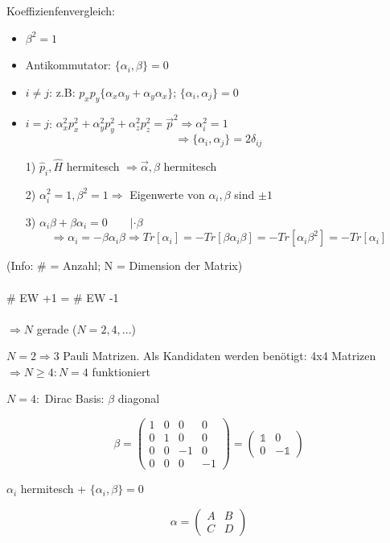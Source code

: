 Koeffizienfenvergleich:
\begin{itemize}
\item  \(\boxed{\beta^2=1}\)
\item Antikommutator: \(\boxed{\{\alpha_i,\beta\}=0}\)
\item \(i\neq j\): z.B: \(p_xp_y\{\alpha_x\alpha_y+\alpha_y\alpha_x\}\); \(\{\alpha_i,\alpha_j\}=0\)
\item \(i=j\): \(\alpha_x^2p_x^2+\alpha_y^2p_y^2+\alpha_z^2p_z^2=\vec p^2 \Rightarrow \alpha_i^2 = 1\)
\[\Rightarrow \boxed{\{\alpha_i,\alpha_j\}=2\delta_{ij}}\]
\end{itemize}


\begin{enumerate}
\item[1)] \(\hat p_i,\hat H\) hermitesch \(\Rightarrow \vec\alpha,\beta\) hermitesch
\item[2)] \(\alpha_i^2=1,\beta^2=1 \Rightarrow \) Eigenwerte von \(\alpha_i,\beta\) sind \(\pm 1\)
\item[3)] \(\alpha_i\beta + \beta\alpha_i=0\qquad |\cdot \beta\)
\[\Rightarrow \alpha_i=-\beta\alpha_i\beta \Rightarrow Tr[\alpha_i] = -Tr[\beta\alpha_i\beta]=-Tr[\alpha_i\beta^2]=-Tr[\alpha_i]\]
\end{enumerate}

(Info: \# = Anzahl; N = Dimension der Matrix)\\
\\
\# EW +1 = \# EW -1\\
\\
\(\Rightarrow N\) gerade (\(N=2,4,...\))

\(N=2\Rightarrow 3\) Pauli Matrizen. Als Kandidaten werden benötigt: 4x4 Matrizen
\(\Rightarrow N\geq 4: N=4\) funktioniert

\(N=4:\) Dirac Basis: \(\beta\) diagonal

\[\beta=\begin{pmatrix}1&0&0&0\\ 0&1&0&0\\ 0&0&-1&0\\0&0&0&-1\end{pmatrix}= \begin{pmatrix}\mathbb 1&0\\ 0&-\mathbb 1\end{pmatrix}\]

\(\alpha_i\) hermitesch + \(\{\alpha_i,\beta\}=0\)

\[\alpha =\begin{pmatrix}A&B\\ C&D\end{pmatrix} \]

